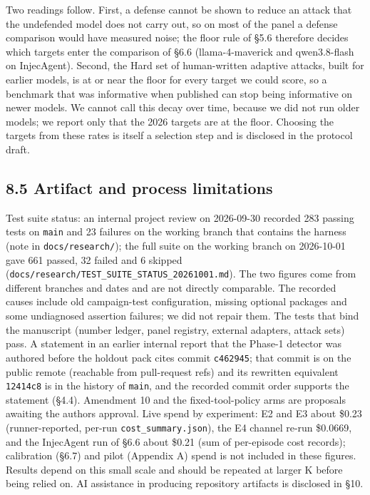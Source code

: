 \documentclass[9pt]{extarticle}
\begin{document}


Two readings follow. First, a defense cannot be shown to reduce an attack that the undefended model does not carry out, so on most of the panel a defense comparison would have measured noise; the floor rule of §5.6 therefore decides which targets enter the comparison of §6.6 (llama-4-maverick and qwen3.8-flash on InjecAgent). Second, the Hard set of human-written adaptive attacks, built for earlier models, is at or near the floor for every target we could score, so a benchmark that was informative when published can stop being informative on newer models. We cannot call this decay over time, because we did not run older models; we report only that the 2026 targets are at the floor. Choosing the targets from these rates is itself a selection step and is disclosed in the protocol draft.

\subsection{8.5 Artifact and process limitations}

Test suite status: an internal project review on 2026-09-30 recorded 283 passing tests on \texttt{main} and 23 failures on the working branch that contains the harness (note in \texttt{docs/\allowbreak{}research/\allowbreak{}}); the full suite on the working branch on 2026-10-01 gave 661 passed, 32 failed and 6 skipped (\texttt{docs/\allowbreak{}research/\allowbreak{}TEST\_\allowbreak{}SUITE\_\allowbreak{}STATUS\_\allowbreak{}20261001.md}). The two figures come from different branches and dates and are not directly comparable. The recorded causes include old campaign-test configuration, missing optional packages and some undiagnosed assertion failures; we did not repair them. The tests that bind the manuscript (number ledger, panel registry, external adapters, attack sets) pass. A statement in an earlier internal report that the Phase-1 detector was authored before the holdout pack cites commit \texttt{c462945}; that commit is on the public remote (reachable from pull-request refs) and its rewritten equivalent \texttt{12414c8} is in the history of \texttt{main}, and the recorded commit order supports the statement (§4.4). Amendment 10 and the fixed-tool-policy arms are proposals awaiting the authors\textquotesingle{} approval. Live spend by experiment: E2 and E3 about \$0.23 (runner-reported, per-run \texttt{cost\_\allowbreak{}summary.json}), the E4 channel re-run \$0.0669, and the InjecAgent run of §6.6 about \$0.21 (sum of per-episode cost records); calibration (§6.7) and pilot (Appendix A) spend is not included in these figures. Results depend on this small scale and should be repeated at larger K before being relied on. AI assistance in producing repository artifacts is disclosed in §10.
\end{document}
